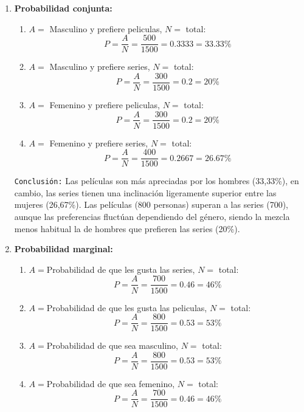\documentclass[12pt]{article}
\begin{document}
        \begin{enumerate}
            \item \textbf{Probabilidad conjunta:}
                \begin{enumerate}
                    \item $A = $ Masculino y prefiere peliculas, $N =$ total:
                        \[P = \frac{A}{N} = \frac{500}{1500} = 0.3333 = 33.33\%\]
                    \item $A = $ Masculino y prefiere series, $N =$ total:
                        \[P = \frac{A}{N} = \frac{300}{1500} = 0.2 = 20\%\]
                    \item $A = $ Femenino y prefiere peliculas, $N =$ total:
                        \[P = \frac{A}{N} = \frac{300}{1500} = 0.2 = 20\%\]
                    \item $A = $ Femenino y prefiere series, $N =$ total:
                        \[P = \frac{A}{N} = \frac{400}{1500} = 0.2667 = 26.67\%\]
                \end{enumerate}

                \texttt{Conclusión:} Las películas son más apreciadas por los hombres (33,33\%), en cambio, las series 
                tienen una inclinación ligeramente superior entre las mujeres (26,67\%). 
                Las películas (800 personas) superan a las series (700), aunque las preferencias fluctúan dependiendo del género, 
                siendo la mezcla menos habitual la de hombres que prefieren las series (20\%). 

            \item \textbf{Probabilidad marginal:}
                \begin{enumerate}
                    \item $A = $Probabilidad de que les gusta las series, $N =$ total:
                        \[P = \frac{A}{N} = \frac{700}{1500} = 0.46 = 46\%\]
                    \item $A = $Probabilidad de que les gusta las peliculas, $N =$ total:
                        \[P = \frac{A}{N} = \frac{800}{1500} = 0.53 = 53\%\]
                    \item $A = $Probabilidad de que sea masculino, $N =$ total:
                        \[P = \frac{A}{N} = \frac{800}{1500} = 0.53 = 53\%\]
                    \item $A = $Probabilidad de que sea femenino, $N =$ total:
                        \[P = \frac{A}{N} = \frac{700}{1500} = 0.46 = 46\%\]
                \end{enumerate}


\end{enumerate}
\end{document}
